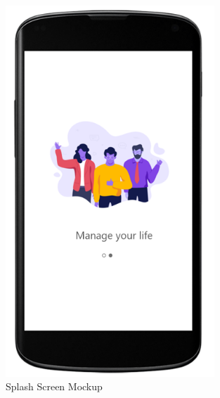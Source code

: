 \begin{figure}[H]
  \centering
  \includegraphics[width=0.7\textwidth,keepaspectratio]{images/4.png}
  \caption{Splash Screen Mockup}
\end{figure}
